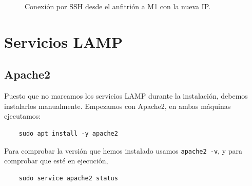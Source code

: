 \documentclass{article}
\begin{document}
\begin{figure}[H]
	\centering
	\caption{Conexión por SSH desde el anfitrión a M1 con la nueva IP.}
	\label{fig:static-ip}
\end{figure}

\section{Servicios LAMP}

\subsection{Apache2}

Puesto que no marcamos los servicios LAMP durante la instalación, debemos instalarlos manualmente. Empezamos con Apache2,
en ambas máquinas ejecutamos:
\begin{verbatim}
	sudo apt install -y apache2
\end{verbatim}

Para comprobar la versión que hemos instalado usamos \texttt{apache2 -v}, y para comprobar que esté en ejecución, 
\begin{verbatim}
	sudo service apache2 status
\end{verbatim}
\end{document}
